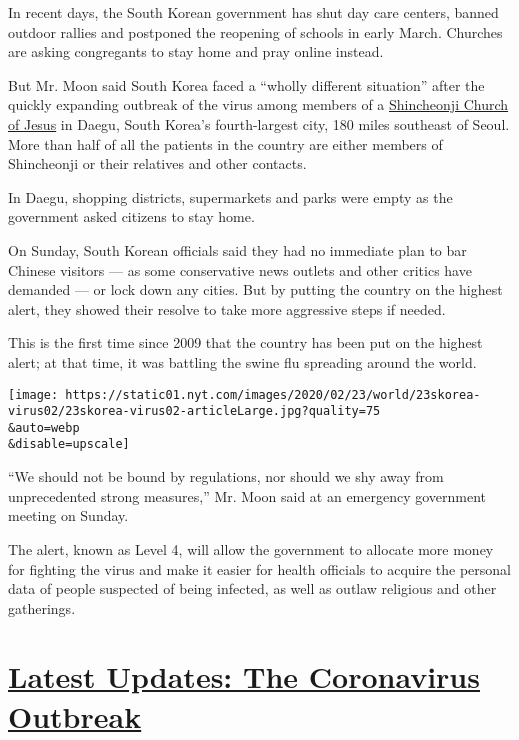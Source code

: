 In recent days, the South Korean government has shut day care centers,
banned outdoor rallies and postponed the reopening of schools in early
March. Churches are asking congregants to stay home and pray online
instead.

But Mr. Moon said South Korea faced a ``wholly different situation''
after the quickly expanding outbreak of the virus among members of a
\href{https://www.nytimes.com/2020/02/21/world/asia/south-korea-coronavirus-shincheonji.html}{Shincheonji
Church of Jesus} in Daegu, South Korea's fourth-largest city, 180 miles
southeast of Seoul. More than half of all the patients in the country
are either members of Shincheonji or their relatives and other contacts.

In Daegu, shopping districts, supermarkets and parks were empty as the
government asked citizens to stay home.

On Sunday, South Korean officials said they had no immediate plan to bar
Chinese visitors --- as some conservative news outlets and other critics
have demanded --- or lock down any cities. But by putting the country on
the highest alert, they showed their resolve to take more aggressive
steps if needed.

This is the first time since 2009 that the country has been put on the
highest alert; at that time, it was battling the swine flu spreading
around the world.

\texttt{[image: https://static01.nyt.com/images/2020/02/23/world/23skorea-virus02/23skorea-virus02-articleLarge.jpg?quality=75\\\&auto=webp\\\&disable=upscale]}

``We should not be bound by regulations, nor should we shy away from
unprecedented strong measures,'' Mr. Moon said at an emergency
government meeting on Sunday.

The alert, known as Level 4, will allow the government to allocate more
money for fighting the virus and make it easier for health officials to
acquire the personal data of people suspected of being infected, as well
as outlaw religious and other gatherings.

\hypertarget{latest-updates-the-coronavirus-outbreak}{%
\section{\texorpdfstring{\href{https://www.nytimes.com/2020/08/17/world/coronavirus-covid.html?action=click\&pgtype=Article\&state=default\&region=MAIN_CONTENT_1\&context=storylines_live_updates}{Latest
Updates: The Coronavirus
Outbreak}}{Latest Updates: The Coronavirus Outbreak}}\label{latest-updates-the-coronavirus-outbreak}}

